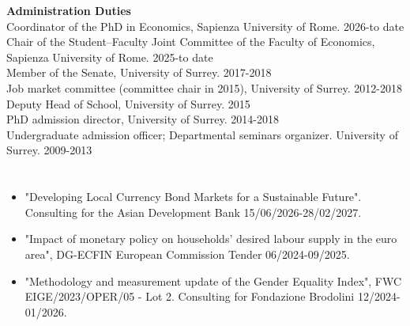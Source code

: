 \documentclass[margin, 11pt]{res} %
\begin{document}
\begin{resume}

\textbf{Administration Duties}\\
Coordinator of the PhD in Economics, Sapienza University of Rome. \hfill 2026-to date\\
Chair of the Student–Faculty Joint Committee of the Faculty of Economics, Sapienza University of Rome. \hfill 2025-to date\\
Member of the Senate, University of Surrey. \hfill 2017-2018\\
Job market committee (committee chair in 2015), University of Surrey. \hfill 2012-2018\\
Deputy Head of School, University of Surrey. \hfill 2015\\
 PhD admission director, University of Surrey. \hfill 2014-2018\\
Undergraduate admission officer; Departmental seminars organizer. University of Surrey. \hfill 2009-2013

\section{}
\begin{itemize}
\item "Developing Local Currency Bond Markets for a Sustainable Future". Consulting for the Asian Development Bank \hfill 15/06/2026-28/02/2027.
\item "Impact of monetary policy on households' desired labour supply in the euro area", DG-ECFIN European Commission Tender \hfill 06/2024-09/2025.
\item "Methodology and measurement update of the Gender Equality Index", FWC EIGE/2023/OPER/05 - Lot 2. Consulting for Fondazione Brodolini \hfill 12/2024-01/2026.
\end{itemize}


\end{resume}
\end{document}
